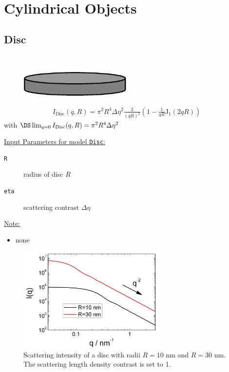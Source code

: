 \section{Cylindrical Objects}
\label{sect:CylindricalObjects}

\subsection{Disc}
\label{sect:Disc}
\hspace{1pt} \\

\begin{figure}[htb]
\begin{center}
\includegraphics[width=0.5\textwidth,height=0.07188\textwidth]{../images/form_factor/cylindrical_obj/disc.png}
\end{center}
\caption{} \label{disc}
\end{figure}
\begin{align}
I_\text{Disc}(q,R)=\pi^2R^4\Delta\eta^2\frac{2}{(qR)^2}
\left(1-\frac{1}{qR}\text{J}_1(2qR)\right)
\end{align}
with $\DS \lim_{q=0}I_\text{Disc}(q,R) = \pi^2R^4\Delta\eta^2$

\vspace{5mm}

\underline{Input Parameters for model \texttt{Disc}:}
\begin{description}
\item[\texttt{R}] radius of disc $R$
\item[\texttt{eta}] scattering contrast $\Delta\eta$
\end{description}

\noindent\underline{Note:}
\begin{itemize}
\item none
\end{itemize}

\begin{figure}[htb]
\begin{center}
\includegraphics[width=0.668\textwidth,height=0.488\textwidth]{../images/form_factor/cylindrical_obj/DiscIQ.png}
\end{center}
\caption{Scattering intensity of a disc with radii $R=10$ nm and $R=30$ nm.
The scattering length density contrast is set to 1.}
\label{fig:I_disc}
\end{figure}

